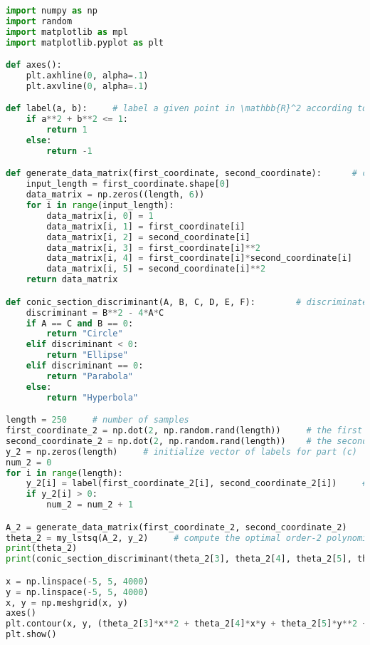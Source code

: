 \documentclass[11pt]{article}
\begin{document}
\begin{lstlisting}[language = Python]
import numpy as np
import random
import matplotlib as mpl
import matplotlib.pyplot as plt

def axes():
    plt.axhline(0, alpha=.1)
    plt.axvline(0, alpha=.1)

def label(a, b):     # label a given point in \mathbb{R}^2 according to the rule (4)
    if a**2 + b**2 <= 1:
        return 1
    else:
        return -1

def generate_data_matrix(first_coordinate, second_coordinate):      # construct a proper data matrix (2-dimensional array) of shape length \times 6
    input_length = first_coordinate.shape[0]
    data_matrix = np.zeros((length, 6))
    for i in range(input_length):
        data_matrix[i, 0] = 1
        data_matrix[i, 1] = first_coordinate[i]
        data_matrix[i, 2] = second_coordinate[i]
        data_matrix[i, 3] = first_coordinate[i]**2
        data_matrix[i, 4] = first_coordinate[i]*second_coordinate[i]
        data_matrix[i, 5] = second_coordinate[i]**2
    return data_matrix

def conic_section_discriminant(A, B, C, D, E, F):        # discriminate the conic section Ax^2 + Bxy + Cy^2 + Dx + Ey + F = 0
    discriminant = B**2 - 4*A*C
    if A == C and B == 0:
        return "Circle"
    elif discriminant < 0:
        return "Ellipse"
    elif discriminant == 0:
        return "Parabola"
    else:
        return "Hyperbola"

length = 250     # number of samples
first_coordinate_2 = np.dot(2, np.random.rand(length))     # the first coordinates of 250 samples chosen uniformly at random from [0, 2] \times [0, 2]
second_coordinate_2 = np.dot(2, np.random.rand(length))    # the second coordinates of 250 samples chosen uniformly at random from [0, 2] \times [0, 2]
y_2 = np.zeros(length)     # initialize vector of labels for part (c)
num_2 = 0
for i in range(length):
    y_2[i] = label(first_coordinate_2[i], second_coordinate_2[i])     # label the 250 random sample points according to the rule (4)
    if y_2[i] > 0:
        num_2 = num_2 + 1

A_2 = generate_data_matrix(first_coordinate_2, second_coordinate_2)
theta_2 = my_lstsq(A_2, y_2)     # compute the optimal order-2 polynomial that minimizes (3)
print(theta_2)
print(conic_section_discriminant(theta_2[3], theta_2[4], theta_2[5], theta_2[1], theta_2[2], theta_2[0]))     # discriminate the conic section formed as the zero set of the optimal order-2 polynomial that minimizes (3) (= the decision boundary)

x = np.linspace(-5, 5, 4000)
y = np.linspace(-5, 5, 4000)
x, y = np.meshgrid(x, y)
axes()
plt.contour(x, y, (theta_2[3]*x**2 + theta_2[4]*x*y + theta_2[5]*y**2 + theta_2[1]*x + theta_2[2]*y + theta_2[0]), [0], colors='k')
plt.show()
\end{lstlisting}
\end{document}
